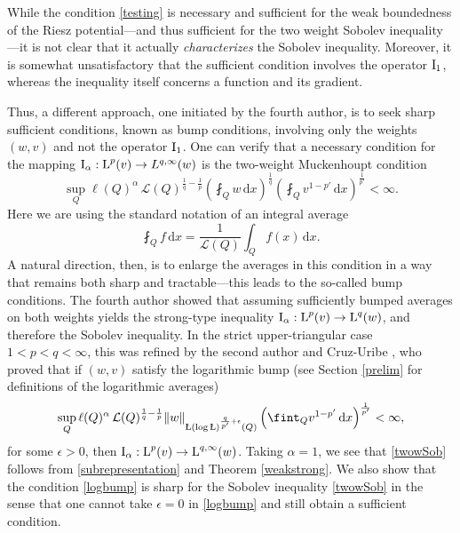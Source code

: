 \documentclass[11pt, a4paper, reqno]{amsart}
\newcommand{\ep}{\epsilon}
\newcommand{\al}{\alpha}
\newcommand{\dx}{\,{\mathrm dx}}
\newcommand{\Lup}{\textup{L}}
\newcommand{\Leb}{\mathcal{L}}
\newcommand{\Ldash}{\textup{\L}}
\theoremstyle{definition}
\theoremstyle{remark}
\begin{document}
While the condition \eqref{testing} is necessary and sufficient for the weak boundedness of the Riesz potential—and thus sufficient for the two weight Sobolev inequality—it is not clear that it actually \emph{characterizes} the Sobolev inequality. Moreover, it is somewhat unsatisfactory that the sufficient condition involves the operator $\textup{I}_1$, whereas the inequality itself concerns a function and its gradient.

Thus, a different approach, one initiated by the fourth author, is to seek sharp sufficient conditions, known as bump conditions, involving only the weights $(w,v)$ and not the operator $\textup{I}_1$. One can verify that a necessary condition for the mapping $\textup{I}_\al:\Lup^p(v)\to L^{q,\infty}(w)$ is the two-weight Muckenhoupt condition
\begin{equation}\label{Apq}
\sup_Q \ell(Q)^\al\,\Leb(Q)^{\frac1q-\frac1p}
\left(\fint_Q w\,\mathrm dx\right)^{\frac1q}
\left(\fint_Q v^{1-p'}\,\mathrm dx\right)^{\frac1{p'}}
<\infty.
\end{equation}
Here we are using the standard notation of an integral average
$$\fint_Q f\dx=\frac{1}{\mathcal L(Q)}\int_Q f(x)\dx.$$
A natural direction, then, is to enlarge the averages in this condition in a way that remains both sharp and tractable—this leads to the so-called bump conditions. The fourth author \cite{Per94} showed that assuming sufficiently bumped averages on both weights yields the strong-type inequality $\textup{I}_\al:\Lup^p(v)\to \Lup^q(w)$, and therefore the Sobolev inequality. In the strict upper-triangular case $1<p<q<\infty$, this was refined by the second author and Cruz-Uribe \cite{CM}, who proved that if $(w,v)$ satisfy the logarithmic bump (see Section \ref{prelim} for definitions of the logarithmic averages)
\begin{equation}\label{logbump}
\sup_Q \ell(Q)^\al\,\Leb(Q)^{\frac1q-\frac1p}
\|w\|_{\Ldash(\log \Ldash)^{\frac{q}{p'}+\ep}(Q)}
\left(\fint_Q v^{1-p'}\,\mathrm dx\right)^{\frac1{p'}}
<\infty,
\end{equation}
for some $\ep>0$, then $\textup{I}_\al:\Lup^p(v)\to \Lup^{q,\infty}(w)$. Taking $\al=1$, we see that \eqref{twowSob} follows from \eqref{subrepresentation} and Theorem \ref{weakstrong}. We also show that the condition \eqref{logbump} is sharp for the Sobolev inequality \eqref{twowSob} in the sense that one cannot take $\ep=0$ in \eqref{logbump} and still obtain a sufficient condition.
\end{document}
